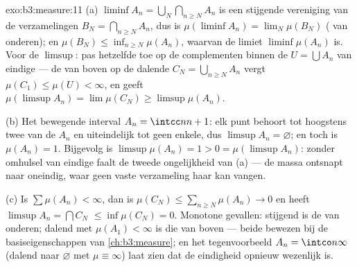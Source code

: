 \begin{solution}{exo:b3:measure:11}
(a) $\liminf A_n = \bigcup_N\bigcap_{n\geq N}A_n$ is een stijgende
vereniging van de verzamelingen $B_N = \bigcap_{n\geq N}A_n$, dus
is $\mu(\liminf A_n) = \lim_N\mu(B_N)$ ( van onderen);
en $\mu(B_N) \leq \inf_{n \geq N}\mu(A_n)$, waarvan de limiet
$\liminf\mu(A_n)$ is. Voor de $\limsup$: pas hetzelfde toe op de
complementen binnen de  $U = \bigcup A_n$ van eindige 
--- de  van boven op de dalende $C_N = \bigcup_{n\geq
N}A_n$ vergt $\mu(C_1) \leq \mu(U) < \infty$, en geeft
$\mu(\limsup A_n) = \lim\mu(C_N) \geq \limsup\mu(A_n)$.

(b) Het bewegende interval $A_n = \intcc n{n+1}$: elk punt behoort
tot hoogstens twee van de $A_n$ en uiteindelijk tot geen enkele,
dus $\limsup A_n = \varnothing$; en toch is $\mu(A_n) = 1$.
Bijgevolg is $\limsup\mu(A_n) = 1 > 0 = \mu(\limsup A_n)$: zonder
omhulsel van eindige  faalt de tweede ongelijkheid van (a) ---
de massa ontsnapt naar oneindig, waar geen vaste verzameling haar
kan vangen.

(c) Is $\sum\mu(A_n) < \infty$, dan is $\mu(C_N) \leq \sum_{n\geq
N}\mu(A_n) \to 0$ en heeft $\limsup A_n = \bigcap C_N$  $\leq
\inf\mu(C_N) = 0$. Monotone gevallen: stijgend is de 
van onderen; dalend met $\mu(A_1) < \infty$ is die van boven ---
beide bewezen bij de basiseigenschappen van
\cref{ch:b3:measure}; en het tegenvoorbeeld $A_n = \intco
n\infty$ (dalend naar $\varnothing$ met $\mu \equiv \infty$) laat
zien dat de eindigheid opnieuw wezenlijk is.
\end{solution}

